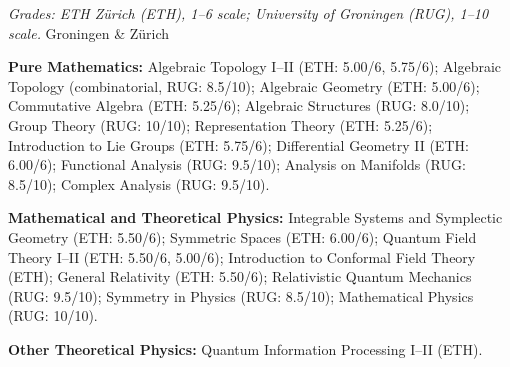 

\begin{cventries}
  \cventry
  {}
  {\textit{Grades: ETH Zürich (ETH), 1--6 scale; University of Groningen (RUG), 1--10 scale.}}
  {Groningen \& Zürich}
  {}
  {
    \vspace{-3mm}
    \begin{cvitems}
      \item {\textbf{Pure Mathematics:}
                  Algebraic Topology I--II (ETH: 5.00/6, 5.75/6);
                  Algebraic Topology (combinatorial, RUG: 8.5/10);
                  Algebraic Geometry (ETH: 5.00/6);
                  Commutative Algebra (ETH: 5.25/6);
                  Algebraic Structures (RUG: 8.0/10);
                  Group Theory (RUG: 10/10);
                  Representation Theory (ETH: 5.25/6);
                  Introduction to Lie Groups (ETH: 5.75/6);
                  Differential Geometry II (ETH: 6.00/6);
                  Functional Analysis (RUG: 9.5/10);
                  Analysis on Manifolds (RUG: 8.5/10);
                  Complex Analysis (RUG: 9.5/10).}
      \item {\textbf{Mathematical and Theoretical Physics:}
                  Integrable Systems and Symplectic Geometry (ETH: 5.50/6);
                  Symmetric Spaces (ETH: 6.00/6);
                  Quantum Field Theory I--II (ETH: 5.50/6, 5.00/6);
                  Introduction to Conformal Field Theory (ETH);
                  General Relativity (ETH: 5.50/6);
                  Relativistic Quantum Mechanics (RUG: 9.5/10);
                  Symmetry in Physics (RUG: 8.5/10);
                  Mathematical Physics (RUG: 10/10).}
      \item {\textbf{Other Theoretical Physics:}
                  Quantum Information Processing I--II (ETH).}
    \end{cvitems}
  }
\end{cventries}
